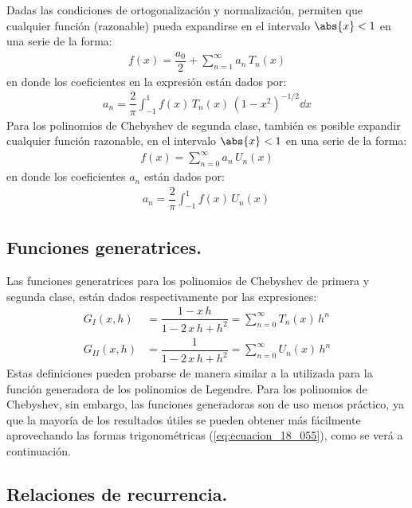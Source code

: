 Dadas las condiciones de ortogonalización y normalización, permiten que cualquier función (razonable) pueda expandirse en el intervalo $\abs{x} < 1$ en una serie de la forma:
\begin{align*}
f(x) = \dfrac{a_{0}}{2} + \sum_{n=1}^{\infty} a_{n} \, T_{n} (x)
\end{align*}
en donde los coeficientes en la expresión están dados por:
\begin{align*}
a_{n} = \dfrac{2}{\pi} \int_{-1}^{1} f(x) \, T_{n} (x) \, (1 - x^{2})^{-1/2} \dd{x}
\end{align*}
Para los polinomios de Chebyshev de segunda clase, también es posible expandir cualquier función razonable, en el intervalo $\abs{x} < 1$ en una serie de la forma:
\begin{align*}
f(x) = \sum_{n=0}^{\infty} a_{n} \, U_{n} (x)
\end{align*}
en donde los coeficientes $a_{n}$ están dados por:
\begin{align*}
a_{n} = \dfrac{2}{\pi} \int_{-1}^{1} f(x) \, U_{n}(x) \, 
\end{align*}

\subsection{Funciones generatrices.}

Las funciones generatrices para los polinomios de Chebyshev de primera y segunda clase, están dados respectivamente por las expresiones:
\begin{align}
G_{I} (x, h) &= \dfrac{1 - x \, h}{1 - 2 \, x \, h + h^{2}} = \sum_{n=0}^{\infty} T_{n} (x) \, h^{n} \label{eq:ecuacion_18_063} \\[0.5em]
G_{II} (x, h) &= \dfrac{1}{1 - 2 \, x \, h + h^{2}} = \sum_{n=0}^{\infty} U_{n} (x) \, h^{n} \label{eq:ecuacion_18_064}
\end{align}
Estas definiciones pueden probarse de manera similar a la utilizada para la función generadora de los polinomios de Legendre. Para los polinomios de Chebyshev, sin embargo, las funciones generadoras son de uso menos práctico, ya que la mayoría de los resultados útiles se pueden obtener más fácilmente aprovechando las formas trigonométricas (\ref{eq:ecuacion_18_055}), como se verá a continuación.

\subsection{Relaciones de recurrencia.}

